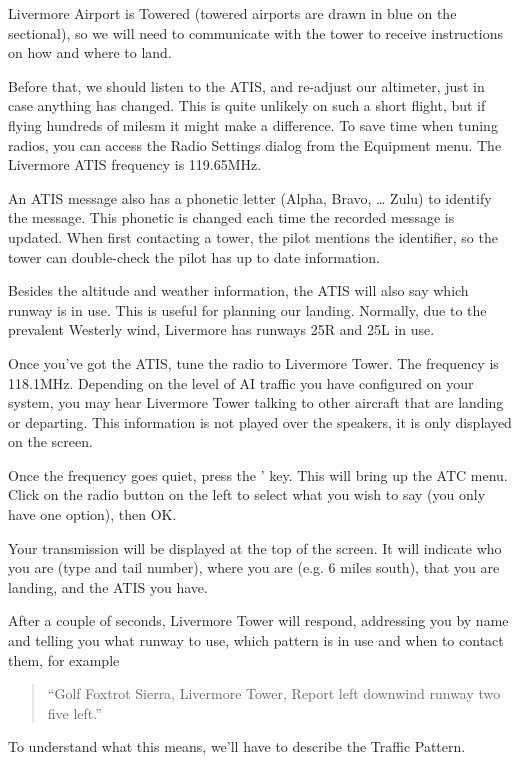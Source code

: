 Livermore Airport is Towered (towered airports are drawn in blue on the sectional),
so we will need to communicate with the tower to receive instructions on how and where to land.

Before that, we should listen to the ATIS, and re-adjust our altimeter,
just in case anything has changed. This is quite unlikely on such a short flight,
but if flying hundreds of milesm it might make a difference. To save time when tuning
radios, you can access the Radio Settings dialog from the Equipment menu.
The Livermore ATIS frequency is 119.65MHz.

An ATIS message also has a phonetic letter (Alpha, Bravo, \ldots{} Zulu) to identify
the message. This phonetic is changed each time the recorded message is updated.
When first contacting a tower, the pilot mentions the identifier, so the tower can
double-check the pilot has up to date information.

Besides the altitude and weather information, the ATIS will also say which runway is in use.
This is useful for planning our landing. Normally, due to the prevalent Westerly wind,
Livermore has runways 25R and 25L in use.

Once you've got the ATIS, tune the radio to Livermore Tower. The frequency is 118.1MHz.
Depending on the level of AI traffic you have configured on your system, you may hear
Livermore Tower talking to other aircraft that are landing or departing.
This information is not played over the speakers, it is only displayed on the screen.

Once the frequency goes quiet, press the ' key. This will bring up the ATC menu.
Click on the radio button on the left to select what you wish to say (you only have one option), then OK.

Your transmission will be displayed at the top of the screen.
It will indicate who you are (type and tail number), where you are (e.g. 6 miles south),
that you are landing, and the ATIS you have.

After a couple of seconds, Livermore Tower will respond, addressing you by name and
telling you what runway to use, which pattern is in use and when to contact them, for example

\begin{quote}
``Golf Foxtrot Sierra, Livermore Tower, Report left downwind runway two five left.''
\end{quote}

To understand what this means, we'll have to describe the Traffic Pattern.

